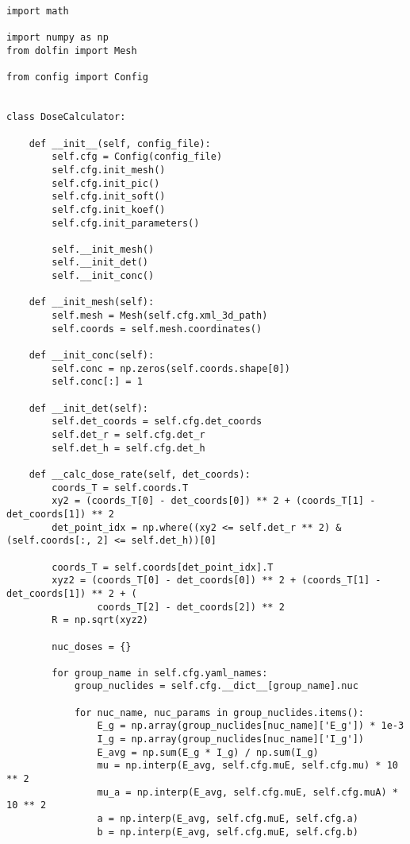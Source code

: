 \begin{lstlisting}[caption=Исходный код модуля расчета мощности эквивалентной дозы внешнего гамма-излучения, 
                    label={lst_dose_calc}, basicstyle=\scriptsize]
import math

import numpy as np
from dolfin import Mesh

from config import Config


class DoseCalculator:

    def __init__(self, config_file):
        self.cfg = Config(config_file)
        self.cfg.init_mesh()
        self.cfg.init_pic()
        self.cfg.init_soft()
        self.cfg.init_koef()
        self.cfg.init_parameters()

        self.__init_mesh()
        self.__init_det()
        self.__init_conc()

    def __init_mesh(self):
        self.mesh = Mesh(self.cfg.xml_3d_path)
        self.coords = self.mesh.coordinates()

    def __init_conc(self):
        self.conc = np.zeros(self.coords.shape[0])
        self.conc[:] = 1

    def __init_det(self):
        self.det_coords = self.cfg.det_coords
        self.det_r = self.cfg.det_r
        self.det_h = self.cfg.det_h

    def __calc_dose_rate(self, det_coords):
        coords_T = self.coords.T
        xy2 = (coords_T[0] - det_coords[0]) ** 2 + (coords_T[1] - det_coords[1]) ** 2
        det_point_idx = np.where((xy2 <= self.det_r ** 2) & (self.coords[:, 2] <= self.det_h))[0]

        coords_T = self.coords[det_point_idx].T
        xyz2 = (coords_T[0] - det_coords[0]) ** 2 + (coords_T[1] - det_coords[1]) ** 2 + (
                coords_T[2] - det_coords[2]) ** 2
        R = np.sqrt(xyz2)

        nuc_doses = {}

        for group_name in self.cfg.yaml_names:
            group_nuclides = self.cfg.__dict__[group_name].nuc

            for nuc_name, nuc_params in group_nuclides.items():
                E_g = np.array(group_nuclides[nuc_name]['E_g']) * 1e-3
                I_g = np.array(group_nuclides[nuc_name]['I_g'])
                E_avg = np.sum(E_g * I_g) / np.sum(I_g)
                mu = np.interp(E_avg, self.cfg.muE, self.cfg.mu) * 10 ** 2
                mu_a = np.interp(E_avg, self.cfg.muE, self.cfg.muA) * 10 ** 2
                a = np.interp(E_avg, self.cfg.muE, self.cfg.a)
                b = np.interp(E_avg, self.cfg.muE, self.cfg.b)


\end{lstlisting}
